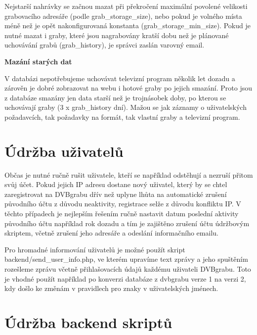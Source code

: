 Nejstarší nahrávky se začnou mazat při překročení maximální povolené velikosti grabovacího adresáře (podle grab\_storage\_size), nebo pokud je volného místa méně než je opět nakonfigurovaná konstanta (grab\_storage\_min\_size). 
Pokud je nutné mazat i graby, které jsou nagrabovány kratší dobu než je plánované uchovávání grabů (grab\_history), je správci zaslán varovný email.

\vspace{10pt}

\textbf{Mazání starých dat}

V databázi nepotřebujeme uchovávat televizní program několik let dozadu a zárověn je dobré zobrazovat na webu i hotové graby po jejich smazání. Proto jsou z databáze smazány jen data starší než je trojnásobek doby, po kterou se uchovávají graby (3 x grab\_history dní). Mažou se jak záznamy o uživatelských požadavcích, tak požadavky na formát, tak vlastní graby a televizní program.

\section{Údržba uživatelů}

Občas je nutné ručně rušit uživatele, kteří se například odstěhují a nezruší přitom svůj účet. Pokud jejich IP adresu dostane nový uživatel, který by se chtel zaregistrovat na DVBgrabu dřív než uplyne lhůta na automatické zrušení původního účtu z důvodu neaktivity, registrace selže z důvodu konfliktu IP. V těchto případech je nejlepším řešením ručně nastavit datum poslední aktivity původního účtu například rok dozadu a tím je zajištěno zrušení účtu údržbovým skriptem, včetně zrušení jeho adresáře a odeslání informačního emailu.

\vspace{10pt}

Pro hromadné informování uživatelů je možné použít skript backend/send\_user\_info.php, ve kterém upravíme text zprávy a jeho spuštěním rozešleme zprávu včetně přihlašovacích údajů každému uživateli DVBgrabu. Toto je vhodné použít například po konverzi databáze z dvbgrabu verze 1 na verzi 2, kdy došlo ke změnám v pravidlech pro znaky v uživatelských jménech.

\vspace{10pt}

\section{Údržba backend skriptů}

